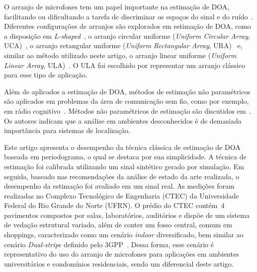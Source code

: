 \documentclass{sbrt2017port}
\begin{document}
O arranjo de microfones tem um papel importante na estimação de DOA, facilitando ou dificultando a tarefa de discriminar os espaços do sinal e do ruído~\cite{Benesty2007OnPerspective}. Diferentes configurações de arranjos são explorados em estimação de DOA, como a disposição em \textit{L-shaped}~\cite{Mazlout2016PerformanceChannel}, o arranjo circular uniforme (\emph{Uniform Circular Array}, UCA)~\cite{Do2017DirectionArrays}, o arranjo retangular uniforme (\emph{Uniform Rectangular Array}, URA)~\cite{Bin20162D-DOAMethod} e, similar ao método utilizado neste artigo, o arranjo linear uniforme (\emph{Uniform Linear Array}, ULA)~\cite{Alamoudi2017SparseConfiguration}. O ULA foi escolhido por representar um arranjo clássico para esse tipo de aplicação.

Além de aplicados a estimação de DOA, métodos de estimação não paramétricos são aplicados em problemas da área de comunicação sem fio, como por exemplo, em rádio cognitivo~\cite{Shahzad2013PeriodogramMatlab,Sarvanko2008CooperativeRadios}.  Métodos não paramétricos de estimação são discutidos em~\cite{Qin2015DoaDependency,Guo2017IndoorClustering}. Os autores indicam que a análise em ambientes desconhecidos é de demasiada importância para sistemas de localização. 

Este artigo apresenta o desempenho da técnica clássica de estimação de DOA baseada em periodograma, o qual se destaca por sua simplicidade. A técnica de estimação foi calibrada utilizando um sinal sintético gerado por simulação. Em seguida, baseado nas recomendações da análise de estado da arte realizada, o desempenho da estimação foi avaliado em um sinal real. As medições foram realizadas no Complexo Tecnológico de Engenharia (CTEC) da Universidade Federal do Rio Grande do Norte (UFRN). O prédio do CTEC contém~4 pavimentos compostos por salas, laboratórios, auditórios e dispõe de um sistema de vedação estrutural variado, além de conter um fosso central, comum em shoppings, caracterizado como um cenário \emph{indoor} diversificado, bem similar ao cenário \emph{Dual-stripe} definido pelo 3GPP~\cite{3GPP_R4_092042}. Dessa forma, esse cenário é representativo do uso do arranjo de microfones para aplicações em ambientes universitários e condomínios residenciais, sendo um diferencial deste artigo.

\end{document}
